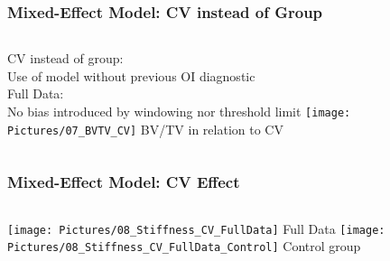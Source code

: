 \documentclass[xcolor=table]{beamer}
\begin{document}

\begin{frame}
	\frametitle{Mixed-Effect Model: CV instead of Group}
	\begin{columns}[c]
		CV instead of group:\\Use of model without previous OI diagnostic
		\\\vspace{1em}
		Full Data:\\No bias introduced by windowing nor threshold limit
		\centering
		\vfill
		\texttt{[image: Pictures/07\_BVTV\_CV]}
		BV/TV in relation to CV
		\vfill
	\end{columns}
\end{frame}


\begin{frame}
	\frametitle{Mixed-Effect Model: CV Effect}
	\begin{columns}[c]
		\centering
		\vfill
		\texttt{[image: Pictures/08\_Stiffness\_CV\_FullData]}
		Full Data
		\vfill
		\centering
		\vfill
		\texttt{[image: Pictures/08\_Stiffness\_CV\_FullData\_Control]}
		Control group
		\vfill
	\end{columns}
\end{frame}

\end{document}
